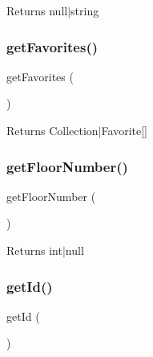 \begin{DoxyReturn}{Returns}
null$\vert$string 
\end{DoxyReturn}
\mbox{\label{class_app_1_1_entity_1_1_possession_a645f4955cea1e0f521355b8128dad326}} 
\subsubsection{\texorpdfstring{getFavorites()}{getFavorites()}}
{\footnotesize\ttfamily get\+Favorites (\begin{DoxyParamCaption}{ }\end{DoxyParamCaption})}

\begin{DoxyReturn}{Returns}
Collection$\vert$\+Favorite\mbox{[}\mbox{]} 
\end{DoxyReturn}
\mbox{\label{class_app_1_1_entity_1_1_possession_ad96dd8e887accad18d821d3dec0d033b}} 
\subsubsection{\texorpdfstring{getFloorNumber()}{getFloorNumber()}}
{\footnotesize\ttfamily get\+Floor\+Number (\begin{DoxyParamCaption}{ }\end{DoxyParamCaption})}

\begin{DoxyReturn}{Returns}
int$\vert$null 
\end{DoxyReturn}
\mbox{\label{class_app_1_1_entity_1_1_possession_a12251d0c022e9e21c137a105ff683f13}} 
\subsubsection{\texorpdfstring{getId()}{getId()}}
{\footnotesize\ttfamily get\+Id (\begin{DoxyParamCaption}{ }\end{DoxyParamCaption})}

